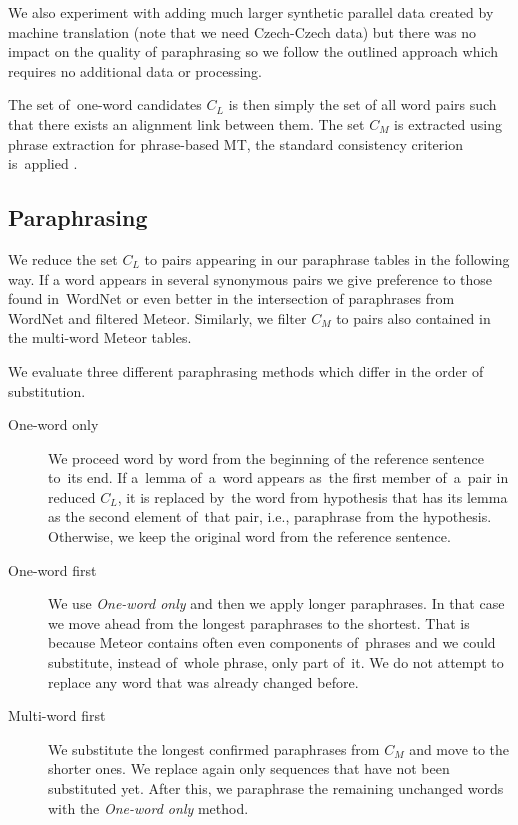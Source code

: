 We also experiment with adding much larger synthetic parallel data created by
machine translation (note that we need Czech-Czech data) but there was no impact
on the quality of paraphrasing so we follow the outlined approach which requires
no additional data or processing.

The set of~one-word candidates $C_L$ is then simply the set of all word pairs such
that there exists an alignment link between them. The set $C_M$ is extracted
using phrase extraction for phrase-based MT, the standard consistency criterion
is~applied \citep{Och99improvedalignment}.

\subsection{Paraphrasing}
We reduce the set $ C_{L} $ to pairs appearing in our paraphrase tables in the 
following way. If a word appears in several synonymous pairs we give preference 
to those found in~WordNet or even better in the intersection of paraphrases 
from WordNet and filtered Meteor. Similarly, we filter $ C_{M} $ to pairs also 
contained in the multi-word Meteor tables.

We evaluate three different paraphrasing methods which differ in the order of
substitution.

\begin{description}
\item[One-word only] We proceed word by word from the beginning of the 
reference sentence to~its end. If a~lemma of~a~word appears as~the first member 
of~a~pair in reduced $ C_{L} $, it is replaced by~the word from hypothesis that has 
its lemma as the second element of~that pair, i.e., paraphrase from the hypothesis. 
Otherwise, we keep the original word from the reference sentence.
\item[One-word first] We use \textit{One-word only} and then we apply longer 
paraphrases. In that case we move ahead from the longest paraphrases to the 
shortest. That is because Meteor contains often even components of~phrases 
and we could substitute, instead of~whole phrase, only part of~it. We do not 
attempt to replace any word that was already changed before.
\item[Multi-word first] We substitute the longest confirmed paraphrases from
$ C_{M} $ and move to the shorter ones. We replace again only sequences that 
have not been substituted yet. After this, we paraphrase the remaining 
unchanged words with the \textit{One-word only} method.
\end{description}

